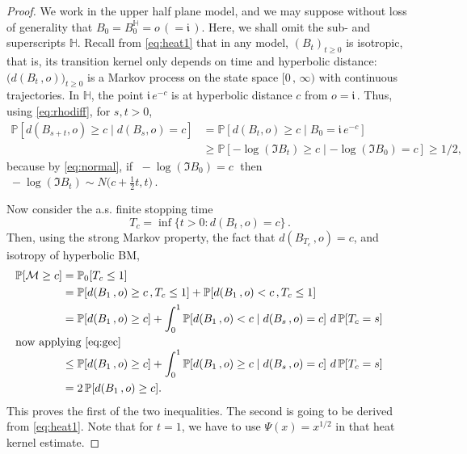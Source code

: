 \documentclass[12pt]{amsart}
\newcommand\HH{\mathbb H}
\newcommand\im{\mathfrak{i}\,}
\newcommand\Prob{\mathbb P}
\newcommand\ro{d}
\numberwithin{theorem}{section}
\theoremstyle{definition}
\begin{document}
\begin{proof}
We work in the upper half plane model, and we may suppose without loss of generality 
that $B_0 = B_0^{\HH} = o \,(=\im)$. Here, we shall omit the sub- and superscripts $\HH$.
Recall from \eqref{eq:heat1} that in any model, $(B_t)_{t \ge 0}$ is isotropic, that is, its
transition kernel only depends on time and hyperbolic distance: 
$\bigl(\ro(B_t\,,o)\bigr)_{t \ge 0}$ is a Markov process on 
the state space $[0\,,\,\infty)$ with continuous trajectories. 
In $\HH$, the point $\im e^{-c}$ is at hyperbolic distance $c$ from $o=\im$. Thus, using \eqref{eq:rhodiff},
for $s, t > 0$,
\begin{equation}\label{eq:gec}
\begin{aligned}
\Prob[\ro(B_{s+t},o) \ge c \mid \ro(B_s,o) = c] 
&= \Prob[\ro(B_{t},o) \ge c \mid B_0 =\im e^{-c}]\\ 
&\ge \Prob[ -\log(\Im B_t) \ge c \mid  -\log(\Im B_0) = c] \ge 1/2,
\end{aligned}
\end{equation}
because by \eqref{eq:normal}, if $\; -\log(\Im B_0) = c\;$ then
$\;-\log(\Im B_t) \sim N\bigl(c+\tfrac12 t, t\bigr)\,$.

Now consider the a.s. finite stopping time
$$
T_c = \inf \{ t > 0:  \ro(B_{t}\,,o) = c \}\,. 
$$
Then, using the strong Markov property, the fact that $\ro(B_{T_c}\,,o)=c$, and isotropy
of hyperbolic BM,
$$
\begin{aligned}
\Prob[ \mathcal{M} \ge c ] &= \Prob_0[ T_c \le 1 ]\\
&= \Prob[ \ro(B_1\,,o) \ge c\,, T_c \le 1 ] + \Prob[ \ro(B_1\,,o) < c\,, T_c \le 1 ]\\
&= \Prob[ \ro(B_1\,,o) \ge c ] 
+ \int_0^1\Prob[ \ro(B_1\,,o) < c  \mid \ro(B_{s}\,,o) =c]\,\,d\,\Prob[T_c=s]\\
\noalign{\noindent now applying \eqref{eq:gec}}\\[-19pt]
&\le \Prob[ \ro(B_1\,,o) \ge c ] 
+ \int_0^1\Prob[ \ro(B_1\,,o) \ge c  \mid \ro(B_{s}\,,o) =c]\,\,d\,\Prob[T_c=s]\\
&= 2\,\Prob[ \ro(B_1\,,o) \ge c ].
\end{aligned}
$$
This proves the first of the two inequalities. The second is going to be derived
from \eqref{eq:heat1}. Note that for $t=1$, we have to use $\Psi(x)=x^{1/2}$ in 
that heat kernel estimate. 


\end{proof}
\end{document}
